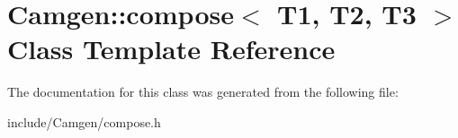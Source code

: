 \hypertarget{a00095}{\section{Camgen\-:\-:compose$<$ T1, T2, T3 $>$ Class Template Reference}
\label{a00095}
}


The documentation for this class was generated from the following file\-:\begin{DoxyCompactItemize}
\item 
include/\-Camgen/compose.\-h\end{DoxyCompactItemize}
